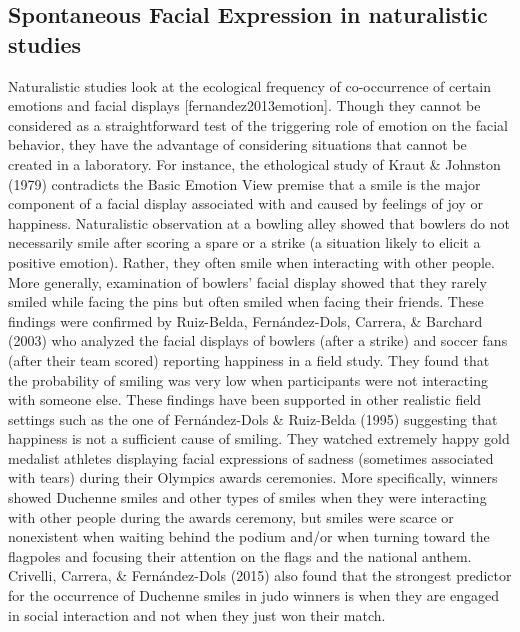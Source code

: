 \documentclass[man]{apa6}
\begin{document}
\hypertarget{spontaneous-facial-expression-in-naturalistic-studies}{%
\subsection{Spontaneous Facial Expression in naturalistic studies}\label{spontaneous-facial-expression-in-naturalistic-studies}}

Naturalistic studies look at the ecological frequency of co-occurrence of certain emotions and facial displays {[}fernandez2013emotion{]}. Though they cannot be considered as a straightforward test of the triggering role of emotion on the facial behavior, they have the advantage of considering situations that cannot be created in a laboratory. For instance, the ethological study of Kraut \& Johnston (1979) contradicts the Basic Emotion View premise that a smile is the major component of a facial display associated with and caused by feelings of joy or happiness. Naturalistic observation at a bowling alley showed that bowlers do not necessarily smile after scoring a spare or a strike (a situation likely to elicit a positive emotion). Rather, they often smile when interacting with other people. More generally, examination of bowlers' facial display showed that they rarely smiled while facing the pins but often smiled when facing their friends. These findings were confirmed by Ruiz-Belda, Fernández-Dols, Carrera, \& Barchard (2003) who analyzed the facial displays of bowlers (after a strike) and soccer fans (after their team scored) reporting happiness in a field study. They found that the probability of smiling was very low when participants were not interacting with someone else. These findings have been supported in other realistic field settings such as the one of Fernández-Dols \& Ruiz-Belda (1995) suggesting that happiness is not a sufficient cause of smiling. They watched extremely happy gold medalist athletes displaying facial expressions of sadness (sometimes associated with tears) during their Olympics awards ceremonies. More specifically, winners showed Duchenne smiles and other types of smiles when they were interacting with other people during the awards ceremony, but smiles were scarce or nonexistent when waiting behind the podium and/or when turning toward the flagpoles and focusing their attention on the flags and the national anthem. Crivelli, Carrera, \& Fernández-Dols (2015) also found that the strongest predictor for the occurrence of Duchenne smiles in judo winners is when they are engaged in social interaction and not when they just won their match.
\end{document}
